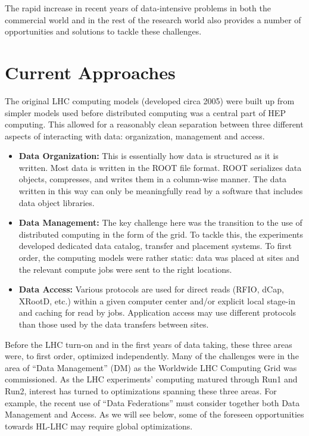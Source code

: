 \documentclass[12pt,a4paper]{article}
\begin{document}
The rapid increase in recent years of data-intensive problems in both
the commercial world and in the rest of the research world also provides
a number of opportunities and solutions to tackle these challenges.

\section{Current Approaches}\label{current-approaches}

The original LHC computing models (developed circa 2005) were built up from
simpler models used before distributed computing was a central part of
HEP computing. This allowed for a reasonably clean separation between
three different aspects of interacting with data: organization,
management and access.

\begin{itemize}
\item \textbf{Data Organization:} This is essentially how data is structured
  as it is written. Most data is written in the ROOT file format. ROOT serializes data objects, compresses, and writes them in a column-wise manner. The data written in this way can only be meaningfully read by a software that includes data object libraries.
\item \textbf{Data Management:} The key challenge here was the transition to
  the use of distributed computing in the form of the grid. To tackle this, the
  experiments developed dedicated data catalog,  transfer and placement systems. To first
  order, the computing models were rather static: data was placed at
  sites and the relevant compute jobs were sent to the right locations.
\item \textbf{Data Access:} Various protocols are used for direct reads
  (RFIO, dCap, XRootD, etc.) within a given computer center and/or
  explicit local stage-in and caching for read by jobs. Application
  access may use different protocols than those used by the data
  transfers between sites.
\end{itemize}

Before the LHC turn-on and in the first years of data taking, these three
areas were, to first order, optimized independently. Many of the
challenges were in the area of ``Data Management'' (DM) as the Worldwide
LHC Computing Grid was commissioned. As the LHC experiments' computing matured
through Run1 and Run2, interest has turned to optimizations spanning
these three areas. For example, the recent use of ``Data Federations''
must consider together both Data Management and Access. As we will see below, some of the
foreseen opportunities towards HL-LHC may require global optimizations.
\end{document}
